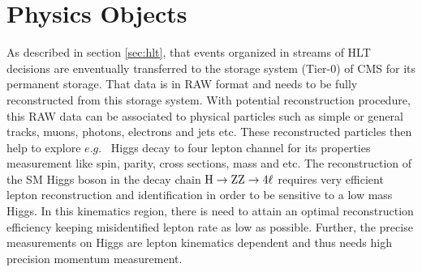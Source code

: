 \chapter{Physics Objects} %
\label{Chapter3}
As described in section \ref{sec:hlt}, that events organized in streams of HLT decisions are enventually transferred to the storage system (Tier-0) of CMS for its permanent storage. 
That data is in RAW format and needs to be fully reconstructed from this storage system. With potential reconstruction procedure, this RAW data can be associated to physical particles such as simple or general tracks, muons, photons, electrons and jets etc.
These reconstructed particles then help to explore $e.g.$~ Higgs decay to four lepton channel for its properties measurement like spin, parity, cross sections, mass and etc.
The reconstruction of the SM Higgs boson in the decay chain $\mathrm{H}\rightarrow\mathrm{ZZ}\rightarrow4\ell$ requires very efficient lepton reconstruction and identification in order to be sensitive
to a low mass Higgs. %
In this kinematics region, 
 there is need to attain an optimal
reconstruction efficiency keeping misidentified lepton rate as low as possible. 
Further, the precise measurements on Higgs are lepton kinematics dependent and thus needs high precision momentum measurement. 
%

